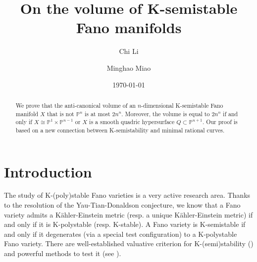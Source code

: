 \documentclass[12pt]{amsart}
\title{On the volume of K-semistable Fano manifolds}
\author{Chi Li}
\author{Minghao Miao}
\date{\today}
\theoremstyle{definition}
\newcommand{\IP}{{\mathbb P}}
\begin{document}
\begin{abstract}



We prove that the anti-canonical volume of an $n$-dimensional K-semistable Fano manifold $X$ that is not $\IP^n$ 
is at most $2n^n$. Moreover, the volume is equal to $2n^n$ if and only if $X\cong \IP^1\times \IP^{n-1}$ or $X$ is a smooth quadric hypersurface $Q\subset \IP^{n+1}$. Our proof is based on a new connection between K-semistability and minimal rational curves. 


\end{abstract}

\maketitle
\tableofcontents

\section{Introduction}

The study of K-(poly)stable Fano varieties is a very active research area. Thanks to the resolution of the Yau-Tian-Donaldson conjecture, we know that a Fano variety admits a K\"{a}hler-Einstein metric (resp. a unique K\"{a}hler-Einstein metric) if and only if it is K-polystable (resp. K-stable). A Fano variety is K-semistable if and only if it degenerates (via a special test configuration) to a K-polystable Fano variety. There are well-established valuative criterion for K-(semi)stability (\cite{Fuj19, Li17}) and powerful methods to test it (see \cite{AZ22}). 
\end{document}
